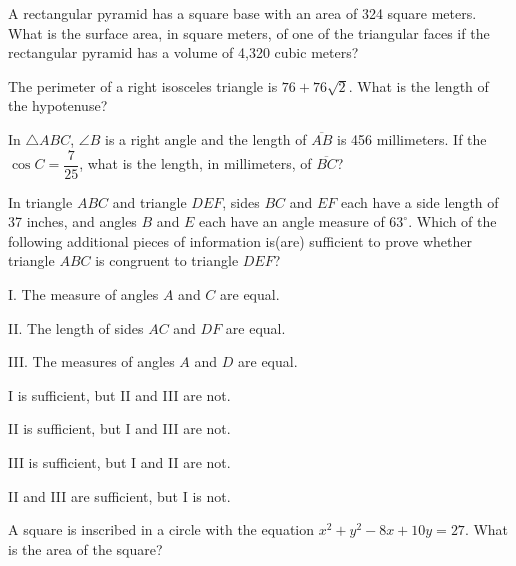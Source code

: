 \vfill
\noindent\begin{minipage}{\linewidth}
\par\smallskip
A rectangular pyramid has a square base with an area of 324 square meters. What is the surface area, in square meters, of one of the triangular faces if the rectangular pyramid has a volume of 4,320 cubic meters?
\end{minipage}
\vfill
\clearpage
\noindent\begin{minipage}{\linewidth}
\par\smallskip
The perimeter of a right isosceles triangle is $76+76\sqrt{2}$. What is the length of the hypotenuse?
\end{minipage}
\vfill
\noindent\begin{minipage}{\linewidth}
\par\smallskip
In $\triangle ABC$, $\angle B$ is a right angle and the length of $\overline{AB}$ is 456 millimeters. If the $\cos C=\dfrac{7}{25}$, what is the length, in millimeters, of $\overline{BC}$?
\end{minipage}
\vfill
\noindent\begin{minipage}{\linewidth}
\par\smallskip
In triangle $ABC$ and triangle $DEF$, sides $BC$ and $EF$ each have a side length of 37 inches, and angles $B$ and $E$ each have an angle measure of $63^\circ$. Which of the following additional pieces of information is(are) sufficient to prove whether triangle $ABC$ is congruent to triangle $DEF$?\par\smallskip I. The measure of angles $A$ and $C$ are equal.\par II. The length of sides $AC$ and $DF$ are equal.\par III. The measures of angles $A$ and $D$ are equal.
\begin{satchoices}
  \item[A)] I is sufficient, but II and III are not.
  \item[B)] II is sufficient, but I and III are not.
  \item[C)] III is sufficient, but I and II are not.
  \item[D)] II and III are sufficient, but I is not.
\end{satchoices}
\end{minipage}
\vfill
\clearpage
\noindent\begin{minipage}{\linewidth}
\par\smallskip
A square is inscribed in a circle with the equation $x^2+y^2-8x+10y=27$. What is the area of the square?
\end{minipage}
